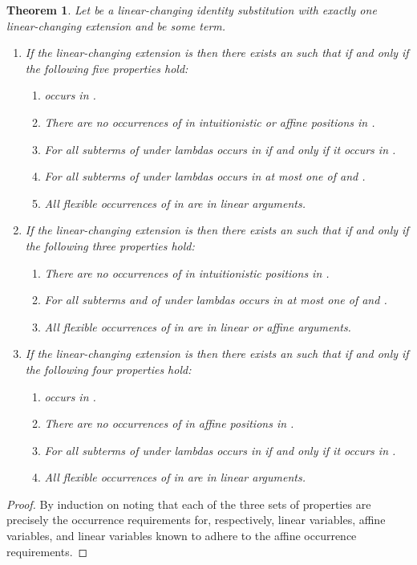 \documentclass{eptcs}
\newtheorem{thm}{Theorem}[section]
\theoremstyle{definition}
\begin{document}
\begin{thm}\label{thm:linprune}
Let  be a linear-changing identity substitution with exactly one
linear-changing extension  and  be some term.
\begin{enumerate}
\item
If the linear-changing extension is 
then there exists an  such that  if
and only if the following five properties hold:
\begin{enumerate}
\item
 occurs in .
\item
There are no occurrences of  in intuitionistic or affine positions in .
\item
For all subterms  of  under  lambdas
 occurs in  if and only if it occurs in .
\item
For all subterms  of  under  lambdas
 occurs in at most one of  and .
\item
All flexible occurrences of  in  are in linear arguments.
\end{enumerate}
\item
If the linear-changing extension is 
then there exists an  such that  if
and only if the following three properties hold:
\begin{enumerate}
\item
There are no occurrences of  in intuitionistic positions in .
\item
For all subterms  and 
of  under  lambdas
 occurs in at most one of  and .
\item
All flexible occurrences of  in  are in linear or affine arguments.
\end{enumerate}
\item
If the linear-changing extension is 
then there exists an  such that  if
and only if the following four properties hold:
\begin{enumerate}
\item
 occurs in .
\item
There are no occurrences of  in affine positions in .
\item
For all subterms  of  under  lambdas
 occurs in  if and only if it occurs in .
\item
All flexible occurrences of  in  are in linear arguments.
\end{enumerate}
\end{enumerate}
\end{thm}
\begin{proof}
By induction on  noting that each of the three sets of
properties are precisely the occurrence requirements for, respectively,
linear variables, affine variables, and linear variables known to adhere
to the affine occurrence requirements.
\end{proof}
\end{document}
